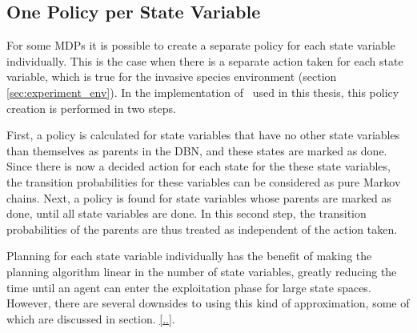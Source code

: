 \subsection{One Policy per State Variable }
\label{sec:one_policy_per_state_variable}
For some MDPs it is possible to create a separate policy for each state variable individually. This is the case when there is a separate action taken for each state variable, which is true for the invasive species environment (section \ref{sec:experiment_env}). In the implementation of \etre\ used in this thesis, this policy creation is performed in two steps. 

First, a policy is calculated for state variables that have no other state variables than themselves as parents in the DBN, and these states are marked as done. Since there is now a decided action for each state for the these state variables, the transition probabilities for these variables can be considered as pure Markov chains. Next, a policy is found for state variables whose parents are marked as done, until all state variables are done. In this second step, the transition probabilities of the parents are thus treated as independent of the action taken. 

Planning for each state variable individually has the benefit of making the planning algorithm linear in the number of state variables, greatly reducing the time until an agent can enter the exploitation phase for large state spaces. However, there are several downsides to using this kind of approximation, some of which are discussed in section. \ref{..}. 
